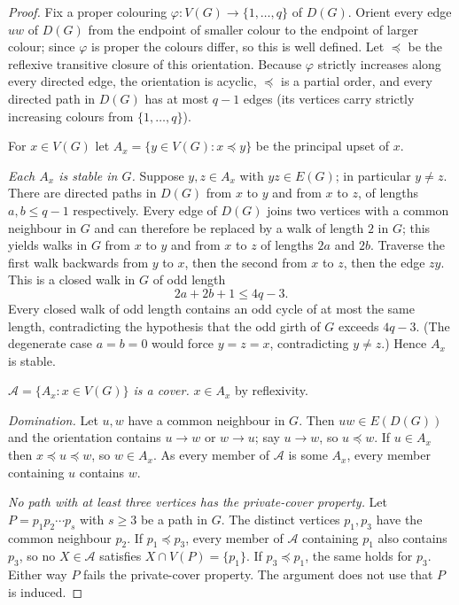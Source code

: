 \documentclass[11pt,a4paper]{article}
\theoremstyle{plain}
\theoremstyle{definition}
\theoremstyle{remark}
\newcommand{\cA}{\mathcal A}
\begin{document}
\label{pf:upset}
\lemupset*
\begin{proof}
Fix a proper colouring $\varphi\colon V(G)\to\{1,\dots,q\}$ of $D(G)$. Orient every edge $uw$ of $D(G)$ from the endpoint of smaller colour to the endpoint of larger colour; since $\varphi$ is proper the colours differ, so this is well defined. Let $\preceq$ be the reflexive transitive closure of this orientation. Because $\varphi$ strictly increases along every directed edge, the orientation is acyclic, $\preceq$ is a partial order, and every directed path in $D(G)$ has at most $q-1$ edges (its vertices carry strictly increasing colours from $\{1,\dots,q\}$).

For $x\in V(G)$ let $A_x=\{y\in V(G):x\preceq y\}$ be the principal upset of $x$.

\emph{Each $A_x$ is stable in $G$.} Suppose $y,z\in A_x$ with $yz\in E(G)$; in particular $y\ne z$. There are directed paths in $D(G)$ from $x$ to $y$ and from $x$ to $z$, of lengths $a,b\le q-1$ respectively. Every edge of $D(G)$ joins two vertices with a common neighbour in $G$ and can therefore be replaced by a walk of length $2$ in $G$; this yields walks in $G$ from $x$ to $y$ and from $x$ to $z$ of lengths $2a$ and $2b$. Traverse the first walk backwards from $y$ to $x$, then the second from $x$ to $z$, then the edge $zy$. This is a closed walk in $G$ of odd length
\[
 2a+2b+1\le4q-3 .
\]
Every closed walk of odd length contains an odd cycle of at most the same length, contradicting the hypothesis that the odd girth of $G$ exceeds $4q-3$. (The degenerate case $a=b=0$ would force $y=z=x$, contradicting $y\ne z$.) Hence $A_x$ is stable.

\emph{$\cA=\{A_x:x\in V(G)\}$ is a cover.} $x\in A_x$ by reflexivity.

\emph{Domination.} Let $u,w$ have a common neighbour in $G$. Then $uw\in E(D(G))$ and the orientation contains $u\to w$ or $w\to u$; say $u\to w$, so $u\preceq w$. If $u\in A_x$ then $x\preceq u\preceq w$, so $w\in A_x$. As every member of $\cA$ is some $A_x$, every member containing $u$ contains $w$.

\emph{No path with at least three vertices has the private-cover property.} Let $P=p_1p_2\cdots p_s$ with $s\ge3$ be a path in $G$. The distinct vertices $p_1,p_3$ have the common neighbour $p_2$. If $p_1\preceq p_3$, every member of $\cA$ containing $p_1$ also contains $p_3$, so no $X\in\cA$ satisfies $X\cap V(P)=\{p_1\}$. If $p_3\preceq p_1$, the same holds for $p_3$. Either way $P$ fails the private-cover property. The argument does not use that $P$ is induced.
\end{proof}
\end{document}
